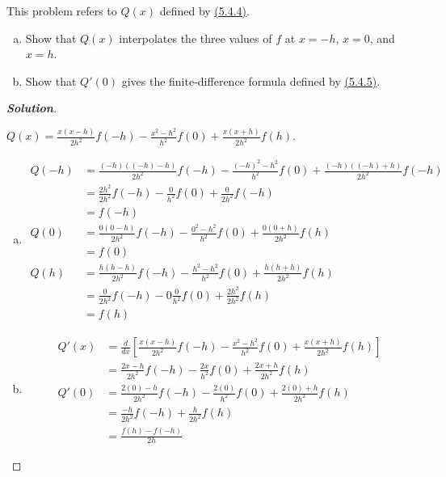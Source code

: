 \documentclass[11pt]{article}
\newenvironment{problem}[2][Question]{\begin{trivlist}
\item[\hskip \labelsep {\bfseries #1}\hskip \labelsep {\bfseries #2.}]}{\end{trivlist}}
\newenvironment{solution}{%
  \begin{proof}[\textbf{Solution}]$ $\par\nobreak\ignorespaces
}{%
  \end{proof}
}
\theoremstyle{definition}
\begin{document}
\begin{problem}{5.4.1}
This problem refers to $Q(x)$ defined by \href{https://fncbook.com/finitediffs/#fdinterp2}{(5.4.4)}.
\begin{enumerate}[(a)]
    \item Show that $Q(x)$ interpolates the three values of $f$ at $x = -h$, $x = 0$, and $x = h$.
    \item Show that $Q'(0)$ gives the finite-difference formula defined by \href{https://fncbook.com/finitediffs/#centerfd12}{(5.4.5)}.
\end{enumerate}
\end{problem}
\begin{solution}
$Q(x) = \frac{x(x - h)}{2h^2}{f(-h)} - \frac{x^2 - h^2}{h^2}f(0) + \frac{x(x+h)}{2h^2}f(h).$
\begin{enumerate}[(a)]
    \item
    \begin{align*}
        Q(-h) &= \frac{(-h)((-h) - h)}{2h^2}{f(-h)} - \frac{(-h)^2 - h^2}{h^2}f(0) + \frac{(-h)((-h)+h)}{2h^2}f(-h) \\
        &= \frac{2h^2}{2h^2}f(-h) - \frac{0}{h^2}f(0) + \frac{0}{2h^2}f(-h) \\
        &= f(-h) \\
        Q(0) &= \frac{0(0 - h)}{2h^2}{f(-h)} - \frac{0^2 - h^2}{h^2}f(0) + \frac{0(0+h)}{2h^2}f(h) \\
        &= f(0) \\
        Q(h) &= \frac{h(h - h)}{2h^2}{f(-h)} - \frac{h^2 - h^2}{h^2}f(0) + \frac{h(h+h)}{2h^2}f(h) \\
        &= \frac{0}{2h^2}f(-h) - 0\frac{0}{h^2}f(0) + \frac{2h^2}{2h^2}f(h) \\
        &= f(h)
    \end{align*}
    \item
    \begin{align*}
        Q'(x) &= \frac{d}{dx}\left[\frac{x(x - h)}{2h^2}{f(-h)} - \frac{x^2 - h^2}{h^2}f(0) + \frac{x(x+h)}{2h^2}f(h)\right] \\
        &= \frac{2x - h}{2h^2}f(-h) - \frac{2x}{h^2}f(0) + \frac{2x + h}{2h^2}f(h) \\
        Q'(0) &= \frac{2(0) - h}{2h^2}f(-h) - \frac{2(0)}{h^2}f(0) + \frac{2(0) + h}{2h^2}f(h) \\
        &= \frac{-h}{2h^2}f(-h) + \frac{h}{2h^2}f(h) \\
        &= \frac{f(h) - f(-h)}{2h}
    \end{align*}
\end{enumerate}
\end{solution}
\end{document}
